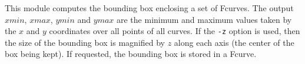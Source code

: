 This module computes the bounding box 
enclosing a set of Fcurves. The output
$xmin$, $xmax$, $ymin$ and $ymax$ are the minimum and maximum
values taken by the $x$ and $y$ coordinates over all points of all curves.
If the \verb+-z+ option is used, then the size of the bounding box is 
magnified by $z$ along each axis (the center of the box being kept). 
If requested, the bounding box is stored in a Fcurve.

